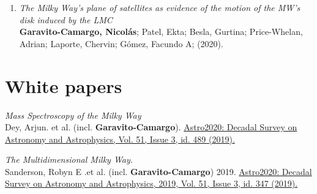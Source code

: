 \documentclass[UTF8]{article}
\begin{document}
\begin{enumerate}
    \item \textit{The Milky Way's plane of satellites as evidence of the motion
      of the MW's disk induced by the LMC}\\ 
      \textbf{Garavito-Camargo, Nicol\'as}; Patel, Ekta; Besla, Gurtina; Price-Whelan,
      Adrian; Laporte, Chervin; G\'omez, Facundo A; (2020). 
\end{enumerate}


\section*{White papers}

\begin{etaremune}
\item \textit{Mass Spectroscopy of the Milky Way} \\
  Dey, Arjun. et al. (incl. \textbf{Garavito-Camargo}).
  \href{https://113qx216in8z1kdeyi404hgf-wpengine.netdna-ssl.com/wp-content/uploads/2019/05/489_dey.pdf}{Astro2020: Decadal
  Survey on Astronomy and Astrophysics, Vol. 51, Issue 3, id. 489 (2019).}
\item \textit{The Multidimensional Milky Way.}\\
 Sanderson, Robyn E .et al. (incl. \textbf{Garavito-Camargo}) 2019.
  \href{https://arxiv.org/abs/1909.07641}{Astro2020: Decadal Survey on
Astronomy and Astrophysics, 2019, Vol. 51, Issue 3, id. 347 (2019).} 
\end{etaremune}
\end{document}

